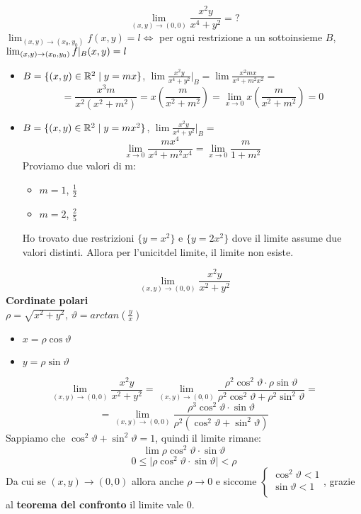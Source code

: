 \begin{eexercise}
  $$\lim_{(x,y)\to(0,0)} \frac{x^2y}{x^4+y^2}=?$$
  $\lim_{(x,y)\to(x_0,y_0)} f(x,y) = l \iff$ per ogni restrizione a un sottoinsieme $B$, $\lim_{(x,y)\to(x_0,y_0)} f\lvert_{B}(x,y) = l$
  \begin{itemize}
    \item $B=\{(x,y)\in\mathbb{R}^2\mid y = mx\}$, $\lim \frac{x^2y}{x^4+y^2} \lvert_{B} = \lim \frac{x^2mx}{x^4 + m^2x^2} = $
    $$= \frac{x^3m}{x^2(x^2+m^2)} = x\left(\frac{m}{x^2+m^2}\right) = \lim_{x\to 0} x\left(\frac{m}{x^2+m^2}\right) = 0$$
    \item $B=\{(x,y)\in\mathbb{R}^2\mid y = mx^2\}$, $\lim \frac{x^2y}{x^4+y^2} \lvert_{B} = $
    $$\lim_{x\to 0} \frac{mx^4}{x^4+m^2x^4} = \lim_{x \to 0} \frac{m}{1+m^2}$$
    Proviamo due valori di m:
    \begin{itemize}
      \item $m = 1$, $\frac{1}{2}$
      \item $m=2$, $\frac{2}{5}$
    \end{itemize} 
    Ho trovato due restrizioni $\{y = x^2\}$ e $\{y = 2x^2\}$ dove il limite assume due valori distinti. 
    Allora per l'unicit\aca del limite, il limite non esiste.
  \end{itemize}
\end{eexercise}
\begin{eexercise}
  $$\lim_{(x,y) \to (0,0)} \frac{x^2y}{x^2+y^2}$$
  \textbf{Cordinate polari}\\
  $\rho = \sqrt{x^2+y^2}$, $\vartheta = arctan\left(\frac{y}{x}\right)$
  \begin{itemize}
    \item $x = \rho \cos \vartheta$
    \item $y = \rho \sin \vartheta$
  \end{itemize}
  $$\lim_{(x,y) \to (0,0)} \frac{x^2y}{x^2+y^2} = \lim_{(x,y)\to (0,0)} \frac{\rho^2 \cos^2 \vartheta \cdot \rho \sin\vartheta}
  {\rho^2 \cos^2 \vartheta + \rho^2 \sin^2 \vartheta} = $$
  $$= \lim_{(x,y)\to (0,0)} \frac{\rho^3 \cos^2 \vartheta \cdot \sin \vartheta}{\rho^2 \left(\cos^2 \vartheta + \sin^2 \vartheta\right)}$$
  Sappiamo che $\cos^2 \vartheta + \sin^2 \vartheta = 1$, quindi il limite rimane:
  $$\lim \rho \cos^2 \vartheta \cdot \sin \vartheta$$
  $$0 \leq \lvert \rho \cos^2 \vartheta \cdot \sin \vartheta \rvert < \rho$$
  Da cui se $(x,y) \to (0,0)$ allora anche $\rho \to 0$ e siccome $\left\{\begin{array}{c}
    \cos^2 \vartheta < 1\\
    \sin \vartheta < 1 \\
  \end{array}\right.$, grazie al 
  \textbf{teorema del confronto} il limite vale 0.
\end{eexercise}
